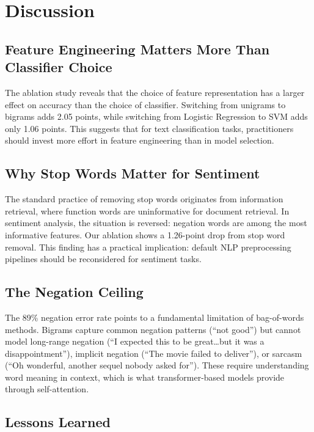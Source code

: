 \documentclass[11pt]{article}
\begin{document}
\section{Discussion}

\subsection{Feature Engineering Matters More Than Classifier Choice}

The ablation study reveals that the choice of feature representation has a larger effect on accuracy than the choice of classifier. Switching from unigrams to bigrams adds 2.05 points, while switching from Logistic Regression to SVM adds only 1.06 points. This suggests that for text classification tasks, practitioners should invest more effort in feature engineering than in model selection.

\subsection{Why Stop Words Matter for Sentiment}

The standard practice of removing stop words originates from information retrieval, where function words are uninformative for document retrieval. In sentiment analysis, the situation is reversed: negation words are among the most informative features. Our ablation shows a 1.26-point drop from stop word removal. This finding has a practical implication: default NLP preprocessing pipelines should be reconsidered for sentiment tasks.

\subsection{The Negation Ceiling}

The 89\% negation error rate points to a fundamental limitation of bag-of-words methods. Bigrams capture common negation patterns (``not good'') but cannot model long-range negation (``I expected this to be great\ldots but it was a disappointment''), implicit negation (``The movie failed to deliver''), or sarcasm (``Oh wonderful, another sequel nobody asked for''). These require understanding word meaning in context, which is what transformer-based models provide through self-attention.

\subsection{Lessons Learned}
\end{document}
